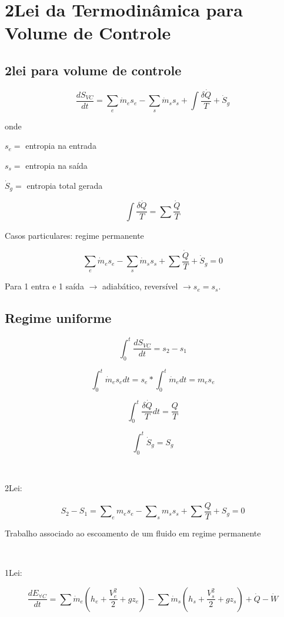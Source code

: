 \chapter{2\textordfeminine Lei da Termodinâmica para Volume de Controle}

\section{2\textordfeminine lei para volume de controle}

\[
\frac{dS_{VC}}{dt} = \sum_e \dot m_e s_e - \sum_s \dot m_s s_s + \int \frac{\delta \dot Q}{T} + \dot S_g
\]

\noindent onde

$s_e =$ entropia na entrada

$s_s =$ entropia na saída

$\dot S_g =$ entropia total gerada

\[
\int{\frac{\delta \dot Q}{T}} = \sum{\frac{\dot Q}{T}}
\]

Casos particulares: regime permanente

\[
\sum_e \dot m_e s_e - \sum_s \dot m_s s_s + \sum \frac{\dot Q}{T} + \dot S_g = 0
\]

Para 1 entra e 1 saída $\to$  adiabático, reversível $\to s_e = s_s$.

\section{Regime uniforme}

\[
\int_0^t {\frac{dS_{VC}}{dt}} = s_2 - s_1
\]

\[
\int_0^t {\dot m_e s_e dt}  = s_e *\int_0^t {\dot m_e dt}  = m_e s_e 
\]

\[
\int_0^t {\frac{\delta \dot Q}{T}dt} = \frac{Q}{T}
\]

\[
\int_0^t {\dot S_g} = S_g
\]

\

2\textordfeminine Lei:

\[
S_2  - S_1  = \sum\nolimits_e {m_e s_e }  - \sum\nolimits_s {m_s s_s }  + \sum {\frac{Q}{T}}  + S_g  = 0
\]

Trabalho associado ao escoamento de um fluido em regime permanente

\

1\textordfeminine Lei:

\[
\frac{{dE_{\forall C} }}{{dt}} = \sum {\dot m_e \left( {h_e  + \frac{{V_e^2 }}{2} + gz_e } \right)}  - \sum {\dot m_s \left( {h_s  + \frac{{V_s^2 }}{2} + gz_s } \right)}  + \dot Q - \dot W
\]

